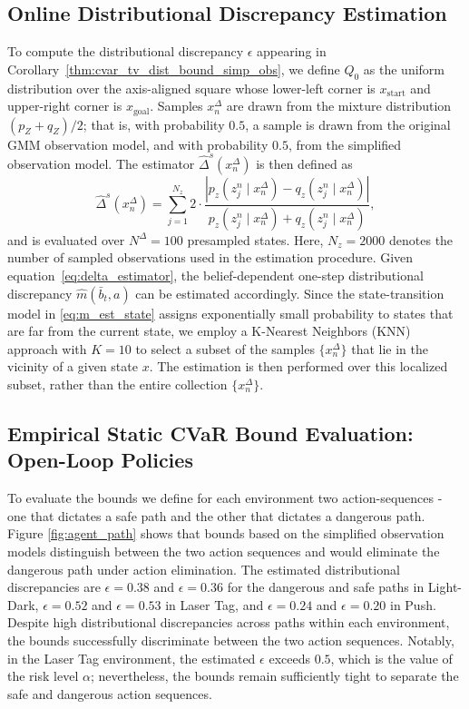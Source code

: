 \documentclass[acmlarge, manuscript, screen, review, natbib=false, oneside]{acmart}
\begin{document}
\subsection{Online Distributional Discrepancy Estimation}
To compute the distributional discrepancy \( \epsilon \) appearing in Corollary~\ref{thm:cvar_tv_dist_bound_simp_obs}, we define \( Q_0 \) as the uniform distribution over the axis-aligned square whose lower-left corner is \( x_{\text{start}} \) and upper-right corner is \( x_{\text{goal}} \). Samples \( x_n^\Delta \) are drawn from the mixture distribution \( (p_Z + q_Z)/2 \); that is, with probability \( 0.5 \), a sample is drawn from the original GMM observation model, and with probability \( 0.5 \), from the simplified observation model. The estimator \( \hat{\Delta}^s(x_n^\Delta) \) is then defined as
\begin{equation}\label{eq:delta_estimator}
	\hat{\Delta}^s(x_n^{\Delta}) = \sum_{j=1}^{N_z} 2 \cdot \frac{\left| p_z(z_j^n \mid x_n^{\Delta}) - q_z(z_j^n \mid x_n^{\Delta}) \right|}{p_z(z_j^n \mid x_n^{\Delta}) + q_z(z_j^n \mid x_n^{\Delta})},
\end{equation}
and is evaluated over $N^\Delta=100$ presampled states. Here, \( N_z = 2000 \) denotes the number of sampled observations used in the estimation procedure. Given equation~\eqref{eq:delta_estimator}, the belief-dependent one-step distributional discrepancy \( \hat{m}(\bar{b}_t, a) \) can be estimated accordingly. Since the state-transition model in \eqref{eq:m_est_state} assigns exponentially small probability to states that are far from the current state, we employ a K-Nearest Neighbors (KNN) approach with $K=10$ to select a subset of the samples \( \{x_n^\Delta\} \) that lie in the vicinity of a given state \( x \). The estimation is then performed over this localized subset, rather than the entire collection \( \{x_n^\Delta\} \).

\subsection{Empirical Static CVaR Bound Evaluation: Open-Loop Policies}
To evaluate the bounds we define for each environment two action-sequences - one that dictates a safe path and the other that dictates a dangerous path. Figure \ref{fig:agent_path} shows that bounds based on the simplified observation models distinguish between the two action sequences and would eliminate the dangerous path under action elimination. The estimated distributional discrepancies are $\epsilon = 0.38$ and $\epsilon = 0.36$ for the dangerous and safe paths in Light-Dark, $\epsilon = 0.52$ and $\epsilon = 0.53$ in Laser Tag, and $\epsilon = 0.24$ and $\epsilon = 0.20$ in Push. Despite high distributional discrepancies across paths within each environment, the bounds successfully discriminate between the two action sequences. Notably, in the Laser Tag environment, the estimated $\epsilon$ exceeds $0.5$, which is the value of the risk level $\alpha$; nevertheless, the bounds remain sufficiently tight to separate the safe and dangerous action sequences.
\end{document}

